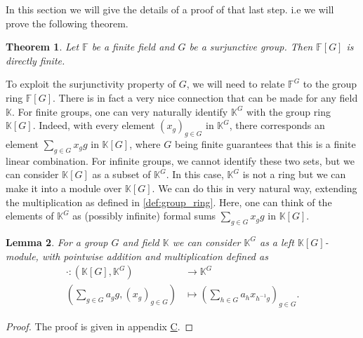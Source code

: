 \documentclass[titlepage, a4paper]{article}
\newcommand{\F}{\mathbb{F}}
\theoremstyle{theoremdd}
\newtheorem{theorem}{Theorem}[section]
\newtheorem{lemma}[theorem]{Lemma}
\theoremstyle{definition}
\theoremstyle{remark}
\newtheorem{remark}[theorem]{Remark}
\begin{document}
	In this section we will give the details of a proof of that last step. 
	i.e we will prove the following theorem. 
	\begin{theorem}\label{thm:gottschalk_kaplansky}
		Let $\F$ be a finite field and $G$ be a surjunctive group. Then $\F[G]$ is directly finite. 
	\end{theorem}
	To exploit the surjunctivity property of $G$, we will need to relate $\mathbb F^G$ to the group ring $\mathbb F[G]$. There is in fact a very nice connection that can be made for any field $\mathbb K$.
	For finite groups, one can very naturally identify $\mathbb K^G$ with the group ring $\mathbb K[G]$. Indeed, with every element $(x_g)_{g \in G}$ in $\mathbb K^G$, there corresponds an element $\sum_{g \in G} x_g g$ in $\mathbb K[G]$, where $G$ being finite guarantees that this is a finite linear combination. For infinite groups, we cannot identify these two sets, but we can consider $\mathbb{K}[G]$ as a subset of $\mathbb K^G$. In this case, $\mathbb K^G$ is not a ring but we can make it into a module over $\mathbb K[G]$. We can do this in very natural way, extending the multiplication as defined in \cref{def:group_ring}. Here, one can think of the elements of $\mathbb K^G$ as (possibly infinite) formal sums $\sum_{g \in G} x_g g$ in $\mathbb K[G]$.

	\begin{lemma}
		For a group $G$ and field $\mathbb K$ we can consider $\mathbb{K}^{G}$ as a left $\mathbb{K}[G]$-module, with pointwise addition and multiplication defined as
		\begin{align*}
			\cdot : (\mathbb{K}[G] , \mathbb{K}^{G}) &\longrightarrow \mathbb{K}^{G} \\
		\left( \sum_{g \in G} a_g g,  (x_g)_{g \in G}\right)  &\longmapsto \left( \sum_{h \in G} a_h x_{h^{-1}g} \right)_{g \in G}
	.\end{align*} 
	\end{lemma}
	\begin{proof}
		The proof is given in appendix \hyperlink{sec:module}{C}.
	\end{proof}
    
\end{document}
